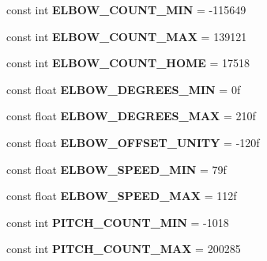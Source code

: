 \begin{DoxyCompactItemize}
\mbox{\label{class_scorbot_e_r_i_x_a0b49ee03e8097f6e7d1dd716c6c8d880}} 
const int {\bfseries E\+L\+B\+O\+W\+\_\+\+C\+O\+U\+N\+T\+\_\+\+M\+IN} = -\/115649
\item 
\mbox{\label{class_scorbot_e_r_i_x_a68f8c9ec65f9a9e0c471f0525d49b74c}} 
const int {\bfseries E\+L\+B\+O\+W\+\_\+\+C\+O\+U\+N\+T\+\_\+\+M\+AX} = 139121
\item 
\mbox{\label{class_scorbot_e_r_i_x_a5a764a3f7db0a23f0e8b2e571fddfef5}} 
const int {\bfseries E\+L\+B\+O\+W\+\_\+\+C\+O\+U\+N\+T\+\_\+\+H\+O\+ME} = 17518
\item 
\mbox{\label{class_scorbot_e_r_i_x_a7e345c8cb678ece3c4b4976d2b7a4c97}} 
const float {\bfseries E\+L\+B\+O\+W\+\_\+\+D\+E\+G\+R\+E\+E\+S\+\_\+\+M\+IN} = 0f
\item 
\mbox{\label{class_scorbot_e_r_i_x_a3ea2ead702e1e405597f075adec13756}} 
const float {\bfseries E\+L\+B\+O\+W\+\_\+\+D\+E\+G\+R\+E\+E\+S\+\_\+\+M\+AX} = 210f
\item 
\mbox{\label{class_scorbot_e_r_i_x_abded31985224d9b6cc3bf0d101c691e2}} 
const float {\bfseries E\+L\+B\+O\+W\+\_\+\+O\+F\+F\+S\+E\+T\+\_\+\+U\+N\+I\+TY} = -\/120f
\item 
\mbox{\label{class_scorbot_e_r_i_x_a288e9b0a384a2bc95ebc19a2602e7757}} 
const float {\bfseries E\+L\+B\+O\+W\+\_\+\+S\+P\+E\+E\+D\+\_\+\+M\+IN} = 79f
\item 
\mbox{\label{class_scorbot_e_r_i_x_ab4ecdd199a869328cf465ce33538de35}} 
const float {\bfseries E\+L\+B\+O\+W\+\_\+\+S\+P\+E\+E\+D\+\_\+\+M\+AX} = 112f
\item 
\mbox{\label{class_scorbot_e_r_i_x_a90f3c619f31e7ee212c1b94dc80fdde2}} 
const int {\bfseries P\+I\+T\+C\+H\+\_\+\+C\+O\+U\+N\+T\+\_\+\+M\+IN} = -\/1018
\item 
\mbox{\label{class_scorbot_e_r_i_x_a108c08642b2dccbd48e7c5585c65726c}} 
const int {\bfseries P\+I\+T\+C\+H\+\_\+\+C\+O\+U\+N\+T\+\_\+\+M\+AX} = 200285

\end{DoxyCompactItemize}

